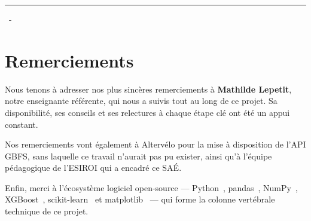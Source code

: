 \documentclass[fleqn, 12pt]{scrartcl}
\newcommand{\ent}{Altervélo}
\begin{document}
\title{\vspace{-1in}}
\author{}
\date{}
\maketitle

\usebox{\myTitleSignature}
\vspace{1in}

{\centering \huge \myTitle{} \par}
{\centering \noindent\rule{4in}{0.1pt} \par}
\vspace{0.05in}
{\centering \mySubTitle{} \mySubSubTitle{} \par}
\vspace{0.2in}
{\centering \myDate{} ~-~ \myVersionn{} \par}
\vspace{1in}


\newpage
\tableofcontents


\newpage

\section*{Remerciements}

Nous tenons à adresser nos plus sincères remerciements à \textbf{Mathilde Lepetit}, notre enseignante référente, qui nous a suivis tout au long de ce projet. Sa disponibilité, ses conseils et ses relectures à chaque étape clé ont été un appui constant.
\vspace{0.5cm}

Nos remerciements vont également à \ent{} pour la mise à disposition de l'API GBFS, sans laquelle ce travail n'aurait pas pu exister, ainsi qu'à l'équipe pédagogique de l'ESIROI qui a encadré ce SAÉ.
\vspace{0.5cm}

Enfin, merci à l'écosystème logiciel open-source --- Python~\cite{python_2024}, pandas~\cite{pandas_2024}, NumPy~\cite{numpy_2024}, XGBoost~\cite{chen_xgboost_2016}, scikit-learn~\cite{scikit_2024} et matplotlib~\cite{matplotlib_2024} --- qui forme la colonne vertébrale technique de ce projet.


\newpage
\end{document}
